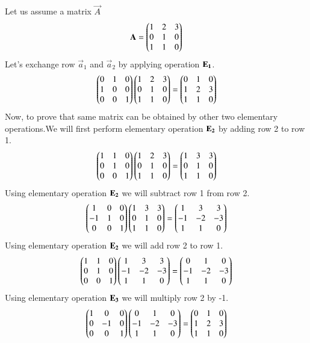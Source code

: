   Let us assume a matrix $\vec{A}$  
 \begin{align}
 \mathbf{A}=\begin{pmatrix}1&2&3\\0&1&0\\1&1&0\end{pmatrix}
  \end{align}
 Let's exchange row $\vec{a}_1$ and $\vec{a}_2$ by applying operation $\bf{E}_1$.
 \begin{align}
 \begin{pmatrix}0&1&0\\1&0&0\\0&0&1\end{pmatrix}\begin{pmatrix}1&2&3\\0&1&0\\1&1&0\end{pmatrix}=
\begin{pmatrix}0&1&0\\1&2&3\\1&1&0\end{pmatrix}\label{eq:solutions/1/2/7/B}
 \end{align}
 Now, to prove that same matrix can be obtained by other two elementary operations.We will first perform elementary operation $\bf{E}_2$ by adding row 2 to row 1.
 \begin{align}
  \begin{pmatrix}1&1&0\\0&1&0\\0&0&1\end{pmatrix}\begin{pmatrix}1&2&3\\0&1&0\\1&1&0\end{pmatrix}=\begin{pmatrix}1&3&3\\0&1&0\\1&1&0\end{pmatrix}
\end{align}
 Using elementary operation $\bf{E}_2$ we will subtract row 1 from row 2.
  \begin{align}
   \begin{pmatrix}1&0&0\\-1&1&0\\0&0&1\end{pmatrix}\begin{pmatrix}1&3&3\\0&1&0\\1&1&0\end{pmatrix}=
\begin{pmatrix}1&3&3\\-1&-2&-3\\1&1&0\end{pmatrix}
 \end{align}
 Using elementary operation $\bf{E}_2$ we will add row 2 to row 1.
  \begin{align}
  \begin{pmatrix}1&1&0\\0&1&0\\0&0&1\end{pmatrix} \begin{pmatrix}1&3&3\\-1&-2&-3\\1&1&0\end{pmatrix}=
\begin{pmatrix}0&1&0\\-1&-2&-3\\1&1&0\end{pmatrix}
 \end{align}
 Using elementary operation $\bf{E}_3$ we will multiply row 2 by -1.
 \begin{align}
   \begin{pmatrix}1&0&0\\0&-1&0\\0&0&1\end{pmatrix} \begin{pmatrix}0&1&0\\-1&-2&-3\\1&1&0\end{pmatrix}=
\begin{pmatrix}0&1&0\\1&2&3\\1&1&0\end{pmatrix}
 \end{align}
